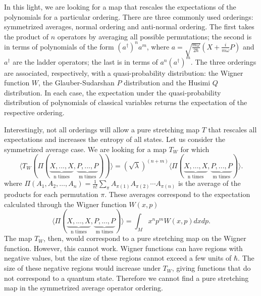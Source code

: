 \documentclass{article}
\begin{document}

In this light, we are looking for a map that rescales the expectations of the polynomials for a particular ordering. There are three commonly used orderings: symmetrized averages, normal ordering and anti-normal ordering. The first takes the product of $n$ operators by averaging all possible permutations; the second is in terms of polynomials of the form $(a^\dagger)^n a^m$, where $a=\sqrt{\frac{m\omega}{2\hbar}}(X+\frac{i}{m\omega}P)$ and $a^\dagger$ are the ladder operators; the last is in terms of $a^n (a^\dagger)^m$. The three orderings are associated, respectively, with a quasi-probability distribution: the Wigner function $W$, the Glauber-Sudarshan $P$ distribution and the Husimi $Q$ distribution. In each case, the expectation under the quasi-probability distribution of polynomials of classical variables returns the expectation of the respective ordering.

Interestingly, not all orderings will allow a pure stretching map $T$ that rescales all expectations and increases the entropy of all states. Let us consider the symmetrized average case. We are looking for a map $T_W$ for which
\begin{equation}
\langle T_W(\Pi(\underbrace{X, ..., X}_{\text{n times}}, \underbrace{P, ..., P}_{\text{m times}})) \rangle = (\sqrt{\lambda})^{(n+m)} \langle \Pi(\underbrace{X, ..., X}_{\text{n times}}, \underbrace{P, ..., P}_{\text{m times}})\rangle.
\end{equation}
where $\Pi(A_1, A_2, \ldots, A_n)  = \frac{1}{n!} \sum_{\pi}  A_{\pi(1)} A_{\pi(2)} \cdots A_{\pi(n)}$ is the average of the products for each permutation $\pi$. These averages correspond to the expectation calculated through the Wigner function $W(x,p)$
\begin{equation}
     \langle \Pi(\underbrace{X, ..., X}_{\text{n times}}, \underbrace{P, ..., P}_{\text{m times}})\rangle = \int_M x^n p^m W(x, p) dx dp.
\end{equation}
The map $T_W$, then, would correspond to a pure stretching map on the Wigner function. However, this cannot work. Wigner functions can have regions with negative values, but the size of these regions cannot exceed a few units of $\hbar$.\cite{kenfack2004negativity} The size of these negative regions would increase under $T_W$, giving functions that do not correspond to a quantum state. Therefore we cannot find a pure stretching map in the symmetrized average operator ordering.
\end{document}
